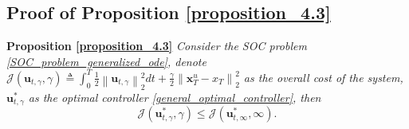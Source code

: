 
\subsection{Proof of Proposition \ref{proposition_4.3}}\label{proof_proposition_4.3}
\textbf{Proposition \ref{proposition_4.3}} \textit{Consider the SOC problem \eqref{SOC_problem_generalized_ode}, denote $\mathcal{J}(\mathbf{u}_{t, \gamma}, \gamma) \triangleq \int_0^T \frac{1}{2} \left\|\mathbf{u}_{t, \gamma}\right\|_2^2 d t+\frac{\gamma}{2}\left\|\mathbf{x}_T^{u}-x_T\right\|_2^2$ as the overall cost of the system, $\mathbf{u}_{t, \gamma}^{*}$ as the optimal controller \eqref{general_optimal_controller}, then}
\begin{equation}
\mathcal{J}(\mathbf{u}_{t, \gamma}^{*}, \gamma) \le \mathcal{J}(\mathbf{u}_{t, \infty}^{*}, \infty). 
\end{equation}

